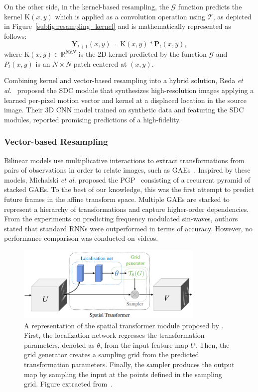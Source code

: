 On the other side, in the kernel-based resampling, the $\mathcal{G}$ function predicts the kernel $\mathrm{K}(x, y)$ which is applied as a convolution operation using $\mathcal{T}$, as depicted in Figure~\ref{subfig:resampling_kernel} and is mathematically represented as follows:
\begin{equation}
\mathbf{Y}_{t+1}(x, y)=\mathrm{K}(x, y) * \mathbf{P}_{t}(x, y),
\end{equation} 
where $\mathrm{K}(x, y)\in\mathbb{R}^{NxN}$ is the 2D kernel predicted by the function $\mathcal{G}$ and $P_t(x,y)$ is an $N \times N$ patch centered at $(x,y)$. %

Combining kernel and vector-based resampling into a hybrid solution, Reda \textit{et al.}~\cite{Reda2018} proposed the \ac{SDC} module that synthesizes high-resolution images applying a learned per-pixel motion vector and kernel at a displaced location in the source image. Their 3D \ac{CNN} model trained on synthetic data and featuring the \ac{SDC} modules, reported promising predictions of a high-fidelity.

\subsubsection{Vector-based Resampling}
Bilinear models use multiplicative interactions to extract transformations from pairs of observations in order to relate images, such as \acp{GAE}~\cite{Memisevic2013a}. Inspired by these models, Michalski \textit{et al.} proposed the \ac{PGP}~\cite{Michalski2014} consisting of a recurrent pyramid of stacked \acp{GAE}. To the best of our knowledge, this was the first attempt to predict future frames in the affine transform space. Multiple \acp{GAE} are stacked to represent a hierarchy of transformations and capture higher-order dependencies. From the experiments on predicting frequency modulated sin-waves, authors stated that standard \acp{RNN} were outperformed in terms of accuracy. However, no performance comparison was conducted on videos. 
\begin{figure}[tbp]
	\centering
	\includegraphics[width=0.8\textwidth]{Figures/videoprediction/methods/spatial_transformer.png}
	\caption{A representation of the spatial transformer module proposed by \cite{Jaderberg2015}. First, the localization network regresses the transformation parameters, denoted as $\theta$, from the input feature map $U$. Then, the grid generator creates a sampling grid from the predicted transformation parameters. Finally, the sampler produces the output map by sampling the input at the points defined in the sampling grid. Figure extracted from~\cite{Jaderberg2015}.}
	\label{fig:spatial_transformer}
\end{figure}

